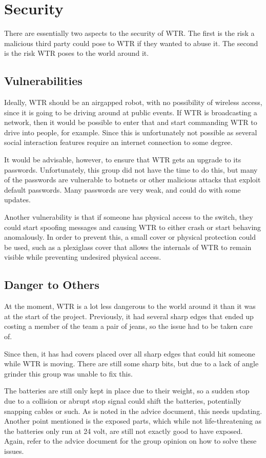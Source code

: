 \section{Security}
There are essentially two aspects to the security of WTR.
The first is the risk a malicious third party could pose to WTR if they wanted to abuse it.
The second is the risk WTR poses to the world around it.

\subsection{Vulnerabilities}
Ideally, WTR should be an airgapped robot, with no possibility of wireless access, since it is going to be driving around at public events.
If WTR is broadcasting a network, then it would be possible to enter that and start commanding WTR to drive into people, for example.
Since this is unfortunately not possible as several social interaction features require an internet connection to some degree.

It would be advisable, however, to ensure that WTR gets an upgrade to its passwords.
Unfortunately, this group did not have the time to do this, but many of the passwords are vulnerable to botnets or other malicious attacks that exploit default passwords.
Many passwords are very weak, and could do with some updates.

Another vulnerability is that if someone has physical access to the switch, they could start spoofing messages and causing WTR to either crash or start behaving anomalously.
In order to prevent this, a small cover or physical protection could be used, such as a plexiglass cover that allows the internals of WTR to remain visible while preventing undesired physical access.\

\subsection{Danger to Others}
At the moment, WTR is a lot less dangerous to the world around it than it was at the start of the project.
Previously, it had several sharp edges that ended up costing a member of the team a pair of jeans, so the issue had to be taken care of.

Since then, it has had covers placed over all sharp edges that could hit someone while WTR is moving.
There are still some sharp bits, but due to a lack of angle grinder this group was unable to fix this.

The batteries are still only kept in place due to their weight, so a sudden stop due to a collision or abrupt stop signal could shift the batteries, potentially snapping cables or such.
As is noted in the advice document, this needs updating.
Another point mentioned is the exposed parts, which while not life-threatening as the batteries only run at 24 volt, are still not exactly good to have exposed.
Again, refer to the advice document for the group opinion on how to solve these issues.

\newpage
